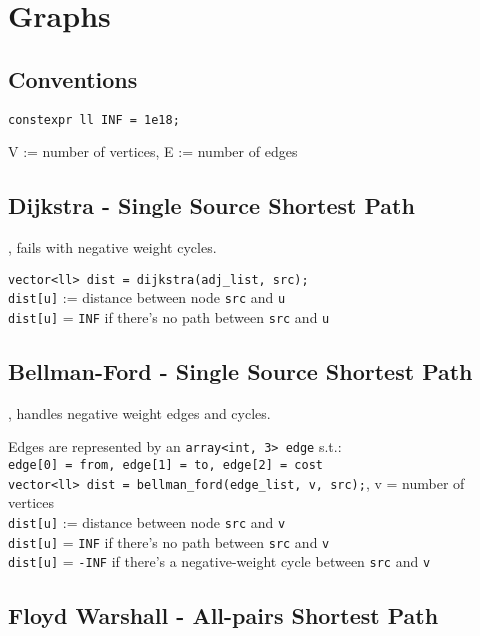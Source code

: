 \section{Graphs}

\subsection{Conventions}
\begin{lstlisting}
constexpr ll INF = 1e18;
\end{lstlisting}
V := number of vertices, E := number of edges

\subsection{Dijkstra - Single Source Shortest Path}
 , fails with negative weight cycles.

\verb|vector<ll> dist = dijkstra(adj_list, src);| \\
\verb|dist[u]| := distance between node \verb|src| and \verb|u| \\
\verb|dist[u]| = \verb|INF| if there's no path between \verb|src| and \verb|u|



\subsection{Bellman-Ford - Single Source Shortest Path}
, handles negative weight edges and cycles.

Edges are represented by an \verb|array<int, 3> edge| s.t.: \\
\verb|edge[0] = from, edge[1] = to, edge[2] = cost| \\
\verb|vector<ll> dist = bellman_ford(edge_list, v, src);|, v = number of vertices \\
\verb|dist[u]| := distance between node \verb|src| and \verb|v| \\
\verb|dist[u]| = \verb|INF| if there's no path between \verb|src| and \verb|v| \\
\verb|dist[u]| = \verb|-INF| if there's a negative-weight cycle between \verb|src| and \verb|v|



\subsection{Floyd Warshall - All-pairs Shortest Path}

